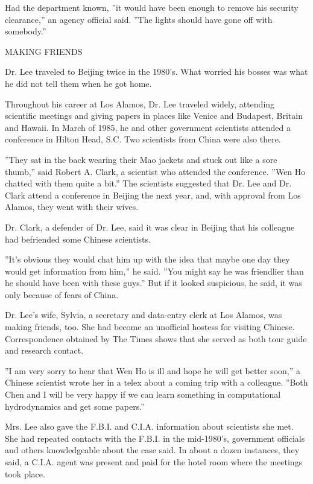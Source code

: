 Had the department known, ''it would have been enough to remove his
security clearance,'' an agency official said. ''The lights should have
gone off with somebody.''

MAKING FRIENDS

Dr. Lee traveled to Beijing twice in the 1980's. What worried his bosses
was what he did not tell them when he got home.

Throughout his career at Los Alamos, Dr. Lee traveled widely, attending
scientific meetings and giving papers in places like Venice and
Budapest, Britain and Hawaii. In March of 1985, he and other government
scientists attended a conference in Hilton Head, S.C. Two scientists
from China were also there.

''They sat in the back wearing their Mao jackets and stuck out like a
sore thumb,'' said Robert A. Clark, a scientist who attended the
conference. ''Wen Ho chatted with them quite a bit.'' The scientists
suggested that Dr. Lee and Dr. Clark attend a conference in Beijing the
next year, and, with approval from Los Alamos, they went with their
wives.

Dr. Clark, a defender of Dr. Lee, said it was clear in Beijing that his
colleague had befriended some Chinese scientists.

''It's obvious they would chat him up with the idea that maybe one day
they would get information from him,'' he said. ''You might say he was
friendlier than he should have been with these guys.'' But if it looked
suspicious, he said, it was only because of fears of China.

Dr. Lee's wife, Sylvia, a secretary and data-entry clerk at Los Alamos,
was making friends, too. She had become an unofficial hostess for
visiting Chinese. Correspondence obtained by The Times shows that she
served as both tour guide and research contact.

''I am very sorry to hear that Wen Ho is ill and hope he will get better
soon,'' a Chinese scientist wrote her in a telex about a coming trip
with a colleague. ''Both Chen and I will be very happy if we can learn
something in computational hydrodynamics and get some papers.''

Mrs. Lee also gave the F.B.I. and C.I.A. information about scientists
she met. She had repeated contacts with the F.B.I. in the mid-1980's,
government officials and others knowledgeable about the case said. In
about a dozen instances, they said, a C.I.A. agent was present and paid
for the hotel room where the meetings took place.

